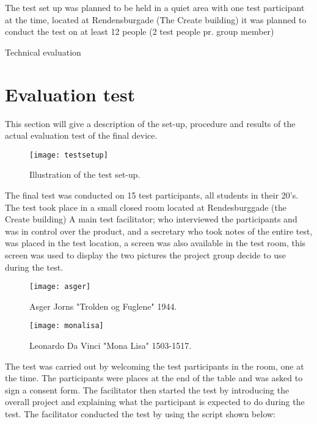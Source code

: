 The test set up was planned to be held in a quiet area with one test participant at the time, located at Rendensburgade (The Create building) it was planned to conduct the test on at least 12 people (2 test people pr. group member) 


Technical evaluation 



\section{Evaluation test}
This section will give a description of the set-up, procedure and results of the actual evaluation test of the final device. 

\begin{figure}[!h] 
\centering
\texttt{[image: testsetup]}
\caption{\label{fig:testsetup} Illustration of the test set-up.}
\end{figure}

The final test was conducted on 15 test participants, all students in their 20's.   The test took place in a small closed room located at Rendesburggade (the Create building) A main test facilitator; who interviewed the participants and was in control over the product, and a secretary who took notes of the entire test, was placed in the test location, a screen was also available in the test room, this screen was used to display the two pictures the project group decide to use during the test.

\begin{figure}[!h] 
\centering
\texttt{[image: asger]}
\caption{\label{fig:asger} Asger Jorns "Trolden og Fuglene" 1944.}
\end{figure}

\begin{figure}[!h] 
\centering
\texttt{[image: monalisa]}
\caption{\label{fig:monalisa} Leonardo Da Vinci "Mona Lisa" 1503-1517.}
\end{figure}

The test was carried out by welcoming the test participants in the room, one at the time. The participants were places at the end of the table and was asked to sign a consent form. The facilitator then started the test by introducing the overall project and explaining what the participant is expected to do during the test. The facilitator conducted the test by using the script shown below:


